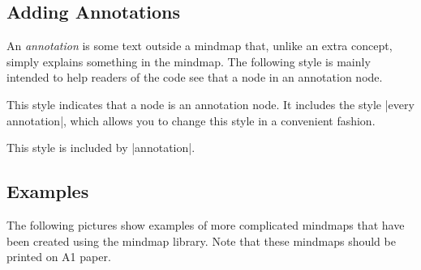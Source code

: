 \subsection{Adding Annotations}

An \emph{annotation} is some text outside a mindmap that, unlike an
extra concept, simply explains something in the mindmap. The following
style is mainly intended to help readers of the code see that a node
in an annotation node.

\begin{itemize}
  This style indicates that a node is an annotation node. It includes
  the style |every annotation|, which allows you to change this style
  in a convenient fashion.
\begin{codeexample}[]

\end{codeexample}
    This style is included by |annotation|.
\end{itemize}


\subsection{Examples}

The following pictures show examples of more complicated mindmaps that
have been created using the mindmap library. Note that these mindmaps
should be printed on A1 paper.

\medskip
\noindent
{}

\medskip
\noindent
{}



